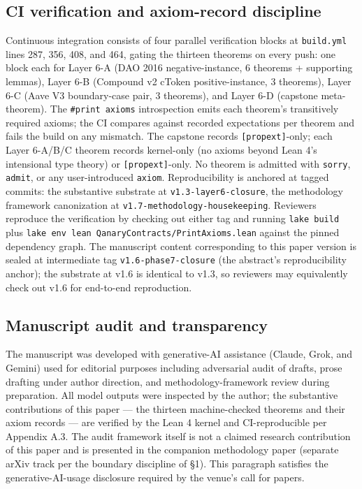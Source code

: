 \subsection{CI verification and axiom-record
discipline}\label{ci-verification-and-axiom-record-discipline}

Continuous integration consists of four parallel verification blocks at
\texttt{build.yml} lines 287, 356, 408, and 464, gating the thirteen
theorems on every push: one block each for Layer 6-A (DAO 2016
negative-instance, 6 theorems + supporting lemmas), Layer 6-B (Compound
v2 cToken positive-instance, 3 theorems), Layer 6-C (Aave V3
boundary-case pair, 3 theorems), and Layer 6-D (capstone meta-theorem).
The \texttt{\#print\ axioms} introspection emits each theorem's
transitively required axioms; the CI compares against recorded
expectations per theorem and fails the build on any mismatch. The
capstone records \texttt{{[}propext{]}}-only; each Layer 6-A/B/C theorem
records kernel-only (no axioms beyond Lean 4's intensional type theory)
or \texttt{{[}propext{]}}-only. No theorem is admitted with
\texttt{sorry}, \texttt{admit}, or any user-introduced \texttt{axiom}.
Reproducibility is anchored at tagged commits: the substantive substrate
at \texttt{v1.3-layer6-closure}, the methodology framework canonization
at \texttt{v1.7-methodology-housekeeping}. Reviewers reproduce the
verification by checking out either tag and running \texttt{lake\ build}
plus \texttt{lake\ env\ lean\ QanaryContracts/PrintAxioms.lean} against
the pinned dependency graph. The manuscript content corresponding to
this paper version is sealed at intermediate tag
\texttt{v1.6-phase7-closure} (the abstract's reproducibility anchor);
the substrate at v1.6 is identical to v1.3, so reviewers may
equivalently check out v1.6 for end-to-end reproduction.

\subsection{Manuscript audit and
transparency}\label{manuscript-audit-and-transparency}

The manuscript was developed with generative-AI assistance (Claude,
Grok, and Gemini) used for editorial purposes including adversarial
audit of drafts, prose drafting under author direction, and
methodology-framework review during preparation. All model outputs were
inspected by the author; the substantive contributions of this paper ---
the thirteen machine-checked theorems and their axiom records --- are
verified by the Lean 4 kernel and CI-reproducible per Appendix A.3. The
audit framework itself is not a claimed research contribution of this
paper and is presented in the companion methodology paper (separate
arXiv track per the boundary discipline of §1). This paragraph satisfies
the generative-AI-usage disclosure required by the venue's call for
papers.

